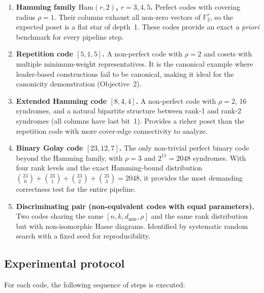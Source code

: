 \documentclass[11pt,twoside,leqno]{article}
\theoremstyle{definition}
\theoremstyle{plain}
\theoremstyle{remark}
\newcommand{\Ftwo}{\mathbb{F}_2}
\newcommand{\covrad}{\rho}
\begin{document}
\begin{enumerate}[leftmargin=*,itemsep=2pt]
\item \textbf{Hamming family $\mathrm{Ham}(r,2)$, $r=3,4,5$.}
  Perfect codes with covering radius $\covrad=1$. Their columns exhaust all non-zero vectors of
  $\Ftwo^r$, so the expected poset is a flat star of depth~1. These codes provide an exact
  \emph{a priori} benchmark for every pipeline step.

\item \textbf{Repetition code $[5,1,5]$.}
  A non-perfect code with $\covrad=2$ and cosets with multiple minimum-weight representatives.
  It is the canonical example where leader-based constructions fail to be canonical, making it
  ideal for the canonicity demonstration (Objective~2).

\item \textbf{Extended Hamming code $[8,4,4]$.}
  A non-perfect code with $\covrad=2$, 16 syndromes, and a natural bipartite structure between
  rank-1 and rank-2 syndromes (all columns have last bit~1). Provides a richer poset than the
  repetition code with more cover-edge connectivity to analyze.

\item \textbf{Binary Golay code $[23,12,7]$.}
  The only non-trivial perfect binary code beyond the Hamming family, with $\covrad=3$ and
  $2^{11}=2048$ syndromes. With four rank levels and the exact Hamming-bound distribution
  $\binom{23}{0}+\binom{23}{1}+\binom{23}{2}+\binom{23}{3}=2048$, it provides the most
  demanding correctness test for the entire pipeline.

\item \textbf{Discriminating pair (non-equivalent codes with equal parameters).}
  Two codes sharing the same $[n,k,d_{\min},\covrad]$ and the same rank distribution but with
  non-isomorphic Hasse diagrams. Identified by systematic random search with a fixed seed for
  reproducibility.
\end{enumerate}

\subsection{Experimental protocol}

For each code, the following sequence of steps is executed:
\end{document}
